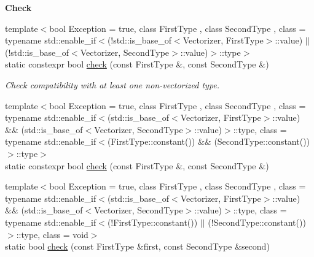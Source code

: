 \begin{Indent}{\bf Check}\par
\begin{DoxyCompactItemize}
\item 
{\footnotesize template$<$bool Exception = true, class First\-Type , class Second\-Type , class  = typename std\-::enable\-\_\-if$<$(!std\-::is\-\_\-base\-\_\-of$<$\-Vectorizer, First\-Type$>$\-::value) $|$$|$ (!std\-::is\-\_\-base\-\_\-of$<$\-Vectorizer, Second\-Type$>$\-::value)$>$\-::type$>$ }\\static constexpr bool \hyperlink{classmagrathea_1_1Vectorizer_a9c5d14ef63c3245c6e3ba161e5efdf95}{check} (const First\-Type \&, const Second\-Type \&)
\begin{DoxyCompactList}\small\item\em Check compatibility with at least one non-\/vectorized type. \end{DoxyCompactList}\item 
{\footnotesize template$<$bool Exception = true, class First\-Type , class Second\-Type , class  = typename std\-::enable\-\_\-if$<$(std\-::is\-\_\-base\-\_\-of$<$\-Vectorizer, First\-Type$>$\-::value) \&\& (std\-::is\-\_\-base\-\_\-of$<$\-Vectorizer, Second\-Type$>$\-::value)$>$\-::type, class  = typename std\-::enable\-\_\-if$<$(\-First\-Type\-::constant()) \&\& (\-Second\-Type\-::constant())$>$\-::type$>$ }\\static constexpr bool \hyperlink{classmagrathea_1_1Vectorizer_a46a8845625441b2b7ca940542c5a42ea}{check} (const First\-Type \&, const Second\-Type \&)
\item 
{\footnotesize template$<$bool Exception = true, class First\-Type , class Second\-Type , class  = typename std\-::enable\-\_\-if$<$(std\-::is\-\_\-base\-\_\-of$<$\-Vectorizer, First\-Type$>$\-::value) \&\& (std\-::is\-\_\-base\-\_\-of$<$\-Vectorizer, Second\-Type$>$\-::value)$>$\-::type, class  = typename std\-::enable\-\_\-if$<$(!\-First\-Type\-::constant()) $|$$|$ (!\-Second\-Type\-::constant())$>$\-::type, class  = void$>$ }\\static bool \hyperlink{classmagrathea_1_1Vectorizer_a8cbb51491c2e83e5cedeced2d5945cde}{check} (const First\-Type \&first, const Second\-Type \&second)
\end{DoxyCompactItemize}
\end{Indent}
